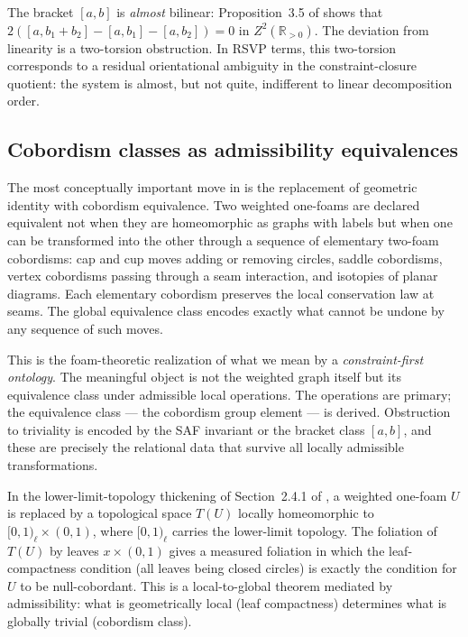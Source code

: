\documentclass[12pt, a4paper]{article}
\theoremstyle{plain}
\theoremstyle{definition}
\theoremstyle{correspondence}
\newcommand{\RR}{\mathbb{R}}
\begin{document}
The bracket $[a,b]$ is \emph{almost} bilinear: Proposition~3.5 of \cite{IK24foam} shows
that $2([a, b_1 + b_2] - [a,b_1] - [a,b_2]) = 0$ in $Z^2(\RR_{>0})$. The deviation from
linearity is a two-torsion obstruction. In RSVP terms, this two-torsion corresponds
to a residual orientational ambiguity in the constraint-closure quotient: the system
is almost, but not quite, indifferent to linear decomposition order.

\subsection{Cobordism classes as admissibility equivalences}

The most conceptually important move in \cite{IK24foam} is the replacement of geometric
identity with cobordism equivalence. Two weighted one-foams are declared equivalent not
when they are homeomorphic as graphs with labels but when one can be transformed into
the other through a sequence of elementary two-foam cobordisms: cap and cup moves
adding or removing circles, saddle cobordisms, vertex cobordisms passing through a
seam interaction, and isotopies of planar diagrams. Each elementary cobordism preserves
the local conservation law at seams. The global equivalence class encodes exactly what
cannot be undone by any sequence of such moves.

This is the foam-theoretic realization of what we mean by a \emph{constraint-first
ontology}. The meaningful object is not the weighted graph itself but its equivalence
class under admissible local operations. The operations are primary; the equivalence
class --- the cobordism group element --- is derived. Obstruction to triviality is
encoded by the SAF invariant or the bracket class $[a,b]$, and these are precisely
the relational data that survive all locally admissible transformations.

In the lower-limit-topology thickening of Section~2.4.1 of \cite{IK24foam}, a
weighted one-foam $U$ is replaced by a topological space $T(U)$ locally homeomorphic
to $[0,1)_\ell \times (0,1)$, where $[0,1)_\ell$ carries the lower-limit topology. The
foliation of $T(U)$ by leaves $x \times (0,1)$ gives a measured foliation in which the
leaf-compactness condition (all leaves being closed circles) is exactly the condition
for $U$ to be null-cobordant. This is a local-to-global theorem mediated by
admissibility: what is geometrically local (leaf compactness) determines what is
globally trivial (cobordism class).

\end{document}
